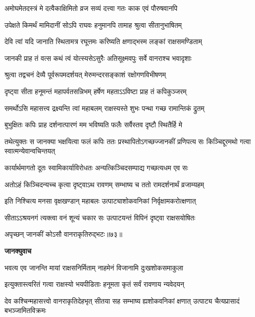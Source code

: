 \twolineshloka
{अमोघमेतदस्त्रं मे दत्वैकाक्षिमितो व्रज}
{सव्यं दत्त्वा गतः काक एवं पौरुषवानपि} %

\twolineshloka
{उपेक्षते किमर्थं मामिदानीं सोऽपि राघवः}
{हनुमानपि तामाह श्रुत्वा सीतानुभाषितम्} %

\twolineshloka
{देवि त्वां यदि जानाति स्थितामत्र रघूत्तमः}
{करिष्यति क्षणाद्भस्म लङ्कां राक्षसमण्डिताम्} %

\twolineshloka
{जानकी प्राह तं वत्स कथं त्वं योत्स्यसेऽसुरैः}
{अतिसूक्ष्मवपुः सर्वे वानराश्च भवादृशाः} %

\twolineshloka
{श्रुत्वा तद्वचनं देव्यै पूर्वरूपमदर्शयत्}
{मेरुमन्दरसङ्काशं रक्षोगणविभीषणम्} %

\twolineshloka
{दृष्ट्वा सीता हनूमन्तं महापर्वतसन्निभम्}
{हर्षेण महताऽऽविष्टा प्राह तं कपिकुञ्जरम्} %

\twolineshloka
{समर्थोऽसि महासत्त्व द्रक्ष्यन्ति त्वां महाबलम्}
{राक्षस्यस्ते शुभः पन्था गच्छ रामान्तिकं द्रुतम्} %

\twolineshloka
{बुभुक्षितः कपिः प्राह दर्शनात्पारणं मम}
{भविष्यति फलैः सर्वैस्तव दृष्टौ स्थितैर्हि मे} %

\threelineshloka
{तथेत्युक्तः स जानक्या भक्षयित्वा फलं कपिः}
{ततः प्रस्थापितोऽगच्छज्जानकीं प्रणिपत्य सः}
{किञ्चिद्दूरमथो गत्वा स्वात्मन्येवान्वचिन्तयत्} %

\twolineshloka
{कार्यार्थमागतो दूतः स्वामिकार्याविरोधतः}
{अन्यत्किञ्चिदसम्पाद्य गच्छत्यधम एव सः} %

\twolineshloka
{अतोऽहं किञ्चिदन्यच्च कृत्वा दृष्ट्वाऽथ रावणम्}
{सम्भाष्य च ततो रामदर्शनार्थं व्रजाम्यहम्} %

\twolineshloka
{इति निश्चित्य मनसा वृक्षखण्डान् महाबलः}
{उत्पाट्याशोकवनिकां निर्वृक्षामकरोत्क्षणात्} %

\twolineshloka
{सीताऽऽश्रयनगं त्यक्त्वा वनं शून्यं चकार सः}
{उत्पाटयन्तं विपिनं दृष्ट्वा राक्षसयोषितः} %

{अपृच्छन् जानकीं कोऽसौ वानराकृतिरुद्भटः॥७३॥} %


\textbf{जानक्युवाच}

\twolineshloka
{भवत्य एव जानन्ति मायां राक्षसनिर्मिताम्}
{नाहमेनं विजानामि दुःखशोकसमाकुला} %

\twolineshloka
{इत्युक्तास्त्वरितं गत्वा राक्षस्यो भयपीडिताः}
{हनूमता कृतं सर्वं रावणाय न्यवेदयन्} %

\threelineshloka
{देव कश्चिन्महासत्त्वो वानराकृतिदेहभृत्}
{सीतया सह सम्भाष्य ह्यशोकवनिकां क्षणात्}
{उत्पाट्य चैत्यप्रासादं बभञ्जामितविक्रमः} %

